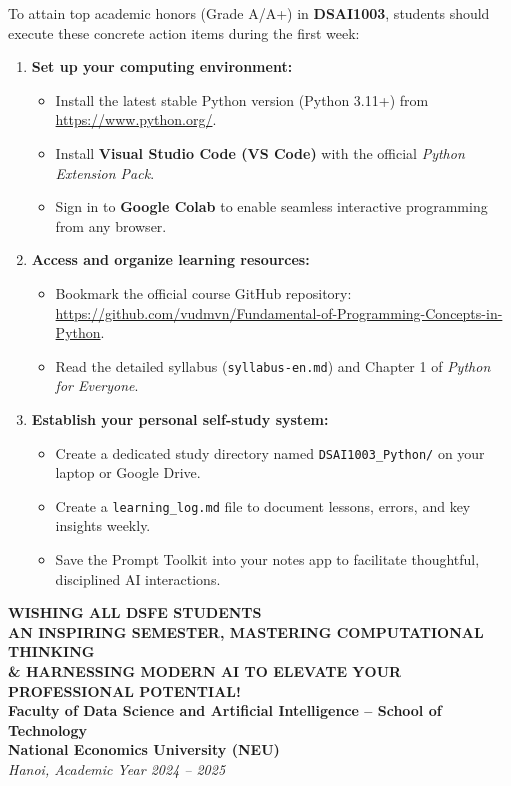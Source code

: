\documentclass[11pt,a4paper]{article}
\begin{document}
To attain top academic honors (Grade A/A+) in \textbf{DSAI1003}, students should execute these concrete action items during the first week:

\begin{enumerate}[leftmargin=1.5em, itemsep=4pt]
    \item \textbf{Set up your computing environment:}
    \begin{itemize}
        \item Install the latest stable Python version (Python 3.11+) from \url{https://www.python.org/}.
        \item Install \textbf{Visual Studio Code (VS Code)} with the official \textit{Python Extension Pack}.
        \item Sign in to \textbf{Google Colab} to enable seamless interactive programming from any browser.
    \end{itemize}
    \item \textbf{Access and organize learning resources:}
    \begin{itemize}
        \item Bookmark the official course GitHub repository: \url{https://github.com/vudmvn/Fundamental-of-Programming-Concepts-in-Python}.
        \item Read the detailed syllabus (\texttt{syllabus-en.md}) and Chapter 1 of \textit{Python for Everyone}.
    \end{itemize}
    \item \textbf{Establish your personal self-study system:}
    \begin{itemize}
        \item Create a dedicated study directory named \texttt{DSAI1003\_Python/} on your laptop or Google Drive.
        \item Create a \texttt{learning\_log.md} file to document lessons, errors, and key insights weekly.
        \item Save the Prompt Toolkit into your notes app to facilitate thoughtful, disciplined AI interactions.
    \end{itemize}
\end{enumerate}

\vspace{5mm}

\begin{tcolorbox}[enhanced, colback=primaryblue!5, colframe=primaryblue, arc=4pt, boxrule=1pt, top=4mm, bottom=4mm, left=5mm, right=5mm]
\begin{center}
    {\large\bfseries\color{primaryblue}WISHING ALL DSFE STUDENTS}\\[2mm]
    {\bfseries\color{secondaryteal}AN INSPIRING SEMESTER, MASTERING COMPUTATIONAL THINKING}\\
    {\bfseries\color{secondaryteal}\& HARNESSING MODERN AI TO ELEVATE YOUR PROFESSIONAL POTENTIAL!}\\[4mm]
    \small
    \textbf{Faculty of Data Science and Artificial Intelligence -- School of Technology}\\
    \textbf{National Economics University (NEU)}\\
    \textit{Hanoi, Academic Year 2024 -- 2025}
\end{center}
\end{tcolorbox}
\end{document}
